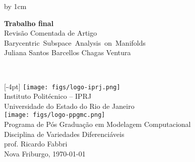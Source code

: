\begin{titlepage}
\renewcommand{\title}{%
  {\LARGE Revisão Comentada de Artigo}\\
  \mbox{Barycentric Subspace Analysis on Manifolds}%
}
\renewcommand{\author}{Juliana Santos Barcellos Chagas Ventura}
\renewcommand{\date}{\today}
\newcommand{\info}{%
  \raisebox{4pt}[-4pt]{%
  \texttt{[image: figs/logo-iprj.png]} 
  \hspace{0.1in}
  }\\

  Instituto Politécnico -- IPRJ\\
  Universidade do Estado do Rio de Janeiro\\[2em]
  
  \texttt{[image: figs/logo-ppgmc.png]}\\
  Programa de Pós Graduação em Modelagem Computacional\\
  Disciplina de Variedades Diferenciáveis\\
  prof. Ricardo Fabbri\\[1em]

  Nova Friburgo, \date\\[1.5cm]
}

\newlength{\topToTitle} 
\setlength{\topToTitle}{0pt}

\newlength{\leftToTitle} 
\setlength{\leftToTitle}{-60pt}

\newlength{\titleToInfo} 
\setlength{\titleToInfo}{10cm}

\newlength{\myTextWidth}
\setlength{\myTextWidth}{\textwidth}
\advance\myTextWidth by 1cm


\thispagestyle{empty}
\vspace*{\topToTitle}
\begin{minipage}{\myTextWidth}
  \sffamily
  \hspace*{\leftToTitle}\begin{minipage}{11cm}
    \Large\textbf{Trabalho final}\\[1.5cm]
    \title\\[1.5cm]
    \author
  \end{minipage}\\

  \vspace*{\titleToInfo}

  \begin{minipage}{\textwidth}
    \flushright
    \info
  \end{minipage}
\end{minipage}%
\end{titlepage}
